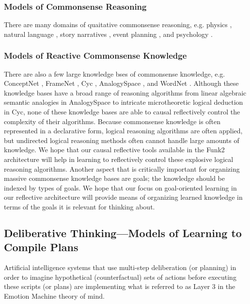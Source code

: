\subsubsection{Models of Commonsense Reasoning}

There are many domains of quaitative commonsense reasoning, e.g. physics \cite[]{forbus:1994}, natural language \cite[]{liu:2004a}, story narratives \cite[]{williams:2005}, event planning \cite[]{smith:2006}, and psychology \cite[]{gordon:2008}.

\subsubsection{Models of Reactive Commonsense Knowledge}

There are also a few large knowledge bses of commonsense knowledge, e.g. ConceptNet \cite[]{liu:2004b}, FrameNet \cite[]{baker:1998}, Cyc \cite[]{lenat:1990}, AnalogySpace \cite[]{speer:2009}, and WordNet \cite[]{fellbaum:1998}.
Although these knowledge bases have a broad range of reasoning algorithms from linear algebraic semantic analogies in AnalogySpace to intricate microtheoretic logical deduction in Cyc, none of these knowledge bases are able to causal reflectively control the complexity of their algorithms.
Because commonsense knowledge is often represented in a declarative form, logical reasoning algorithms are often applied, but undirected logical reasoning methods often cannot handle large amounts of knowledge.
We hope that our causal reflective tools available in the Funk2 architecture will help in learning to reflectively control these explosive logical reasoning algorithms.
Another aspect that is critically important for organizing massive commonsense knowledge bases are goals; the knowledge should be indexed by types of goals.
We hope that our focus on goal-oriented learning in our reflective architecture will provide means of organizing learned knowledge in terms of the goals it is relevant for thinking about.

\subsection{Deliberative Thinking---Models of Learning to Compile Plans}

Artificial intelligence systems that use multi-step deliberation (or planning) in order to imagine hypothetical (counterfactual) sets of actions before executing these scripts (or plans) are implementing what is referred to as Layer 3 in the Emotion Machine theory of mind.

